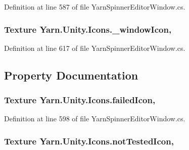 Definition at line 587 of file Yarn\-Spinner\-Editor\-Window.\-cs.

\hypertarget{a00113_abba8fef6cc12836ea431a8a7c9e2f3db}{
\subsubsection[{\-\_\-window\-Icon}]{\setlength{\rightskip}{0pt plus 5cm}Texture Yarn.\-Unity.\-Icons.\-\_\-window\-Icon\hspace{0.3cm}{\ttfamily [static]}, {\ttfamily [private]}}}\label{a00113_abba8fef6cc12836ea431a8a7c9e2f3db}


Definition at line 617 of file Yarn\-Spinner\-Editor\-Window.\-cs.



\subsection{Property Documentation}
\hypertarget{a00113_aae7cc0e5016db04a90b2aa0e80957626}{
\subsubsection[{failed\-Icon}]{\setlength{\rightskip}{0pt plus 5cm}Texture Yarn.\-Unity.\-Icons.\-failed\-Icon\hspace{0.3cm}{\ttfamily [static]}, {\ttfamily [get]}}}\label{a00113_aae7cc0e5016db04a90b2aa0e80957626}


Definition at line 598 of file Yarn\-Spinner\-Editor\-Window.\-cs.

\hypertarget{a00113_ab8afce565cd2ad1543d1e32e7e589e77}{
\subsubsection[{not\-Tested\-Icon}]{\setlength{\rightskip}{0pt plus 5cm}Texture Yarn.\-Unity.\-Icons.\-not\-Tested\-Icon\hspace{0.3cm}{\ttfamily [static]}, {\ttfamily [get]}}}\label{a00113_ab8afce565cd2ad1543d1e32e7e589e77}


